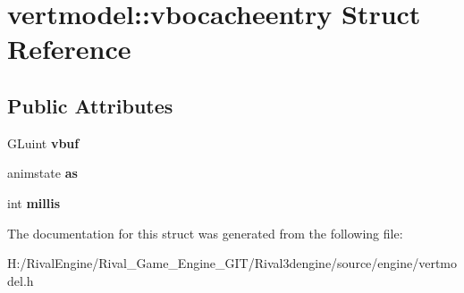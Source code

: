 \hypertarget{structvertmodel_1_1vbocacheentry}{}\section{vertmodel\+:\+:vbocacheentry Struct Reference}
\label{structvertmodel_1_1vbocacheentry}
\subsection*{Public Attributes}
\begin{DoxyCompactItemize}
\item 
\mbox{\label{structvertmodel_1_1vbocacheentry_a4fb37754212ed734530e4d2691795e77}} 
G\+Luint {\bfseries vbuf}
\item 
\mbox{\label{structvertmodel_1_1vbocacheentry_a837e04329a90736c56ed5df2e88f3743}} 
animstate {\bfseries as}
\item 
\mbox{\label{structvertmodel_1_1vbocacheentry_a29b567cde32c29de317eebbed14c799d}} 
int {\bfseries millis}
\end{DoxyCompactItemize}


The documentation for this struct was generated from the following file\+:\begin{DoxyCompactItemize}
\item 
H\+:/\+Rival\+Engine/\+Rival\+\_\+\+Game\+\_\+\+Engine\+\_\+\+G\+I\+T/\+Rival3dengine/source/engine/vertmodel.\+h\end{DoxyCompactItemize}
